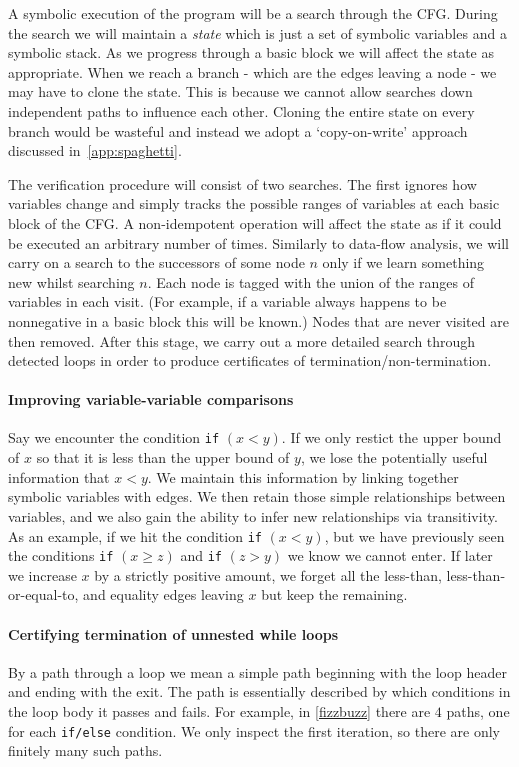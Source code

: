 \documentclass[12pt,a4paper]{article}
\begin{document}
A symbolic execution of the program will be a search through the CFG. During the search we will maintain a \textit{state} which is just a set of symbolic variables and a symbolic stack. As we progress through a basic block we will affect the state as appropriate. 
When we reach a branch - which are the edges leaving a node - we may have to clone the state. This is because we cannot allow searches down independent paths to influence each other. Cloning the entire state on every branch would be wasteful and instead we adopt a `copy-on-write' approach discussed in~\cref{app:spaghetti}.

The verification procedure will consist of two searches. The first ignores how variables change and simply tracks the possible ranges of variables at each basic block of the CFG. A non-idempotent operation will affect the state as if it could be executed an arbitrary number of times. Similarly to data-flow analysis, we will carry on a search to the successors of some node $n$ only if we learn something new whilst searching $n$. Each node is tagged with the union of the ranges of variables in each visit. (For example, if a variable always happens to be nonnegative in a basic block this will be known.) Nodes that are never visited are then removed. After this stage, we carry out a more detailed
search through detected loops in order to produce certificates of termination/non-termination.

\paragraph{Improving variable-variable comparisons}
Say we encounter the condition \texttt{if} $(x < y)$. If we only restict the upper bound of $x$ so that it is less than the upper bound of $y$, we lose the potentially useful information that $x < y$.
We maintain this information by linking together symbolic variables with edges. We then retain those simple relationships between variables, and we also gain the ability to infer new relationships via transitivity.
As an example, if we hit the condition \texttt{if} $(x < y)$, but we have previously seen the conditions \texttt{if} $(x \geq z)$ and \texttt{if} $(z > y)$ we know we cannot enter.
If later we increase $x$ by a strictly positive amount, we forget all the less-than, less-than-or-equal-to, and equality edges leaving $x$ but keep the remaining.

\paragraph{Certifying termination of unnested while loops}\label{par:loops}
By a path through a loop we mean a simple path beginning with the loop header and ending with the exit. The path is essentially described by which conditions
in the loop body it passes and fails. For example, in \cref{fizzbuzz} there are $4$ paths, one for each \texttt{if/else} condition. We only inspect the first iteration, so there are only finitely many such paths.
\end{document}

